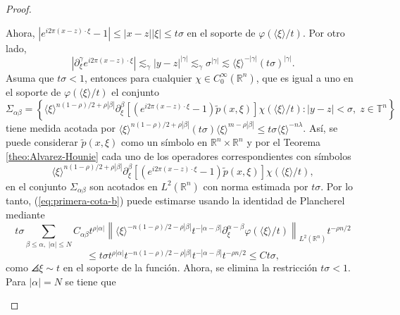 \begin{proof}
\begin{itemize}
\begin{equation*}
		\end{equation*}
		Ahora, $|e^{i2\pi(x - z) \cdot \xi}-1| \leq |x-z||\xi|\leq t\sigma$ en el soporte de $\varphi(\langle\xi\rangle/t)$. Por otro lado, 
		\begin{equation*}
			|\partial^\gamma_\xi e^{i2\pi(x - z) \cdot \xi}| \lesssim_\gamma|y-z|^{|\gamma|} \lesssim_\gamma \sigma ^{|\gamma|} \lesssim \langle\xi\rangle^{-|\gamma|}(t\sigma)^{|\gamma|}.
		\end{equation*}
		Asuma que $t\sigma < 1$, entonces para cualquier $\chi \in C_0^\infty(\mathbb{R}^n)$, que es igual a uno en el soporte de $\varphi(\langle\xi\rangle/t)$ el conjunto
		\begin{equation*}
			\Sigma_{\alpha\beta}=\left\{ \langle\xi\rangle^{n(1 - \rho)/2 + \rho|\beta|} \partial^\beta_\xi \left[\left( e^{i2\pi(x - z) \cdot \xi}-1 \right) 
			\tilde{p}(x, \xi) \right] \chi(\langle\xi\rangle/t) : |y-z| < \sigma,\; z \in \mathbb{T}^n \right\}
		\end{equation*}
		tiene medida acotada por $\langle\xi\rangle^{n(1 - \rho)/2 + \rho|\beta|} (t\sigma)\langle\xi\rangle^{m-\rho |\beta|} \leq t\sigma \langle\xi\rangle^{-n\lambda} $. Así, se puede considerar $\tilde{p}(x, \xi)$ como un símbolo en $\mathbb{R}^n\times\mathbb{R}^n$ y por el Teorema \ref{theo:Alvarez-Hounie} cada uno de los operadores correspondientes con símbolos $$\langle\xi\rangle^{n(1 - \rho)/2 + \rho|\beta|} \partial^\beta_\xi \left[\left( e^{i2\pi(x - z) \cdot \xi}-1 \right) 
		\tilde{p}(x, \xi) \right] \chi(\langle\xi\rangle/t),$$ en el conjunto $\Sigma_{\alpha\beta}$ son acotados en $L^2(\mathbb{R}^n)$ con norma estimada por $t\sigma$.
		Por lo tanto, (\ref{eq:primera-cota-b}) puede estimarse usando la identidad de Plancherel mediante 
		\begin{equation*}
			t\sigma\sum_{\beta\leq\alpha,\;|\alpha|\leq N} C_{\alpha\beta}t^{\rho|\alpha|}\left\|  
			\langle\xi\rangle^{-n(1-\rho)/2 - \rho|\beta|} t^{-|\alpha-\beta|} \partial^{\alpha-\beta}_\xi \varphi(\langle\xi\rangle/t) \right\|_{L^2(\mathbb{R}^n)}t^{-\rho n/2} 
		\end{equation*}
		\begin{equation}
			\leq t\sigma t^{\rho|\alpha|} t^{-n(1-\rho)/2 - \rho|\beta|}t^{-|\alpha-\beta|}t^{-\rho n/2} \leq Ct\sigma, 
			\label{eq:tsigma<1-b}
		\end{equation}
		como $\angles{\xi}\sim t$ en el soporte de la función. Ahora, se elimina la restricción $t\sigma < 1$. Para $|\alpha| = N$ se tiene que
		\begin{equation*}

\end{equation*}
\end{itemize}
\end{proof}
